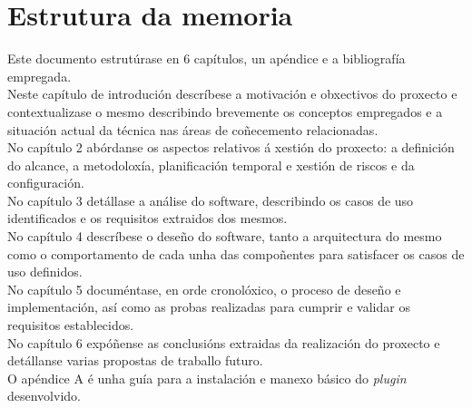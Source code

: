\section{Estrutura da memoria}

Este documento estrutúrase en 6 capítulos, un apéndice e a bibliografía empregada.\\

Neste capítulo de introdución descríbese a motivación e obxectivos do proxecto e contextualizase o mesmo describindo brevemente os conceptos empregados e a situación actual da técnica nas áreas de coñecemento relacionadas.\\

No capítulo 2 abórdanse os aspectos relativos á xestión do proxecto: a definición do alcance, a metodoloxía, planificación temporal e xestión de riscos e da configuración.\\

No capítulo 3 detállase a análise do software, describindo os casos de uso identificados e os requisitos extraidos dos mesmos.\\

No capítulo 4 descríbese o deseño do software, tanto a arquitectura do mesmo como o comportamento de cada unha das compoñentes para satisfacer os casos de uso definidos.\\

No capítulo 5 documéntase, en orde cronolóxico, o proceso de deseño e implementación, así como as probas realizadas para cumprir e validar os requisitos establecidos.\\

No capítulo 6 expóñense as conclusións extraidas da realización do proxecto e detállanse varias propostas de traballo futuro.\\

O apéndice A é unha guía para a instalación e manexo básico do \emph{plugin} desenvolvido.\\

